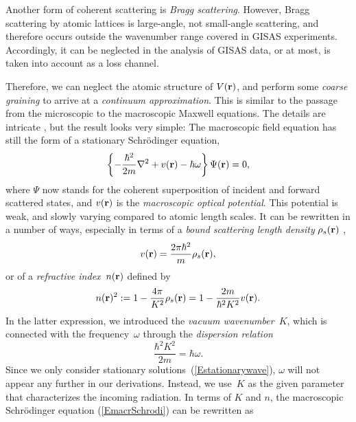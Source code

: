 Another form of coherent scattering is \textit{Bragg scattering}.%
However, Bragg scattering by atomic lattices
is large-angle, not small-angle scattering,
and therefore occurs outside the wavenumber range
covered in GISAS experiments.
Accordingly, it can be neglected in the analysis of GISAS data,
or at most, is taken into account as a loss channel.

Therefore,
we can neglect the atomic structure of $V(\mathbf{r})$,
and perform some \textit{coarse graining} to
arrive at a \textit{continuum approximation}.%
This is 
similar to the passage from
the microscopic to the macroscopic Maxwell equations.
The details are intricate \cite{Sea89,Lax51},
but the result \cite[eq.~2.8.32]{Sea89} looks very simple:
The macroscopic field equation
has still the form of a stationary Schrödinger equation,
\begin{equation}\label{EmacrSchrodi}
  \left\{-\frac{\hbar^2}{2m}\mathbf{\nabla}^2+v(\mathbf{r})-\hbar\omega\right\} \Psi(\mathbf{r}) = 0,
\end{equation}
where $\Psi$ now stands for the coherent superposition of
incident and forward scattered states,
and $v(\mathbf{r})$ is the \textit{macroscopic optical potential}.%
This potential is weak, and slowly varying compared to atomic length scales.
It can be rewritten in a number of ways,
especially in terms of a
\textit{bound scattering length density}%
$\rho_s(\mathbf{r})$ \cite[eq.\ 2.8.37]{Sea89},
\begin{equation}
  v(\mathbf{r})=\frac{2\pi \hbar^2}{m}\rho_s(\mathbf{r}),  
\end{equation}
or of a \textit{refractive index}~$n(\mathbf{r})$%
defined by
\begin{equation}\label{EnRefrIndx}
  n(\mathbf{r})^2:=1-\frac{4\pi}{K^2}\rho_s(\mathbf{r}) = 1 -\frac{2m}{\hbar^2 K^2}v(\mathbf{r}).
\end{equation}
In the latter expression,
we introduced the \textit{vacuum wavenumber}~$K$,
which is connected with the frequency~$\omega$ through the
\textit{dispersion relation}
\begin{equation}
  \frac{\hbar^2 K^2}{2m} = \hbar\omega.
\end{equation}
Since we only consider stationary solutions~(\ref{Estationarywave}),
$\omega$ will not appear any further in our derivations.
Instead, we use~$K$ as the given parameter that characterizes the
incoming radiation.
In terms of $K$ and $n$,
the macroscopic Schrödinger equation (\ref{EmacrSchrodi})
can be rewritten as

